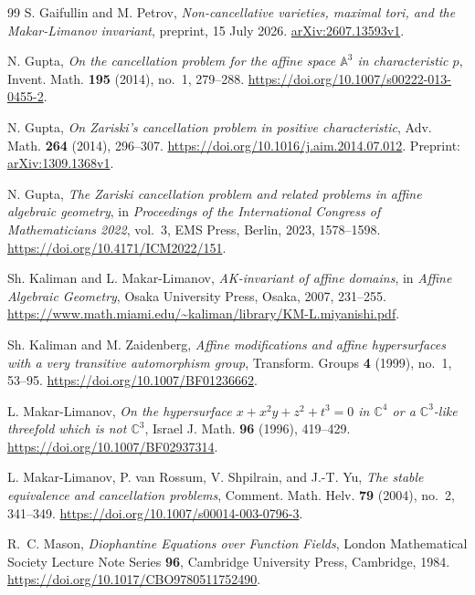\begin{thebibliography}{99}
S. Gaifullin and M. Petrov,
\emph{Non-cancellative varieties, maximal tori, and the Makar-Limanov invariant},
preprint, 15 July 2026.
\href{https://arxiv.org/abs/2607.13593v1}{arXiv:2607.13593v1}.

N. Gupta,
\emph{On the cancellation problem for the affine space $\mathbb A^3$
 in characteristic $p$},
Invent. Math. \textbf{195} (2014), no.~1, 279--288.
\url{https://doi.org/10.1007/s00222-013-0455-2}.

\begingroup\raggedright
N. Gupta,
\emph{On Zariski's cancellation problem in positive characteristic},
Adv. Math. \textbf{264} (2014), 296--307.
\url{https://doi.org/10.1016/j.aim.2014.07.012}.
Preprint: \href{https://arxiv.org/abs/1309.1368v1}{arXiv:1309.1368v1}.
\par\endgroup

N. Gupta,
\emph{The Zariski cancellation problem and related problems in affine algebraic geometry},
in \emph{Proceedings of the International Congress of Mathematicians 2022},
vol.~3, EMS Press, Berlin, 2023, 1578--1598.
\url{https://doi.org/10.4171/ICM2022/151}.

Sh. Kaliman and L. Makar-Limanov,
\emph{AK-invariant of affine domains},
in \emph{Affine Algebraic Geometry}, Osaka University Press, Osaka,
2007, 231--255.
\url{https://www.math.miami.edu/~kaliman/library/KM-L.miyanishi.pdf}.

Sh. Kaliman and M. Zaidenberg,
\emph{Affine modifications and affine hypersurfaces with a very
 transitive automorphism group},
Transform. Groups \textbf{4} (1999), no.~1, 53--95.
\url{https://doi.org/10.1007/BF01236662}.

L. Makar-Limanov,
\emph{On the hypersurface $x+x^2y+z^2+t^3=0$ in $\mathbb C^4$ or a
 $\mathbb C^3$-like threefold which is not $\mathbb C^3$},
Israel J. Math. \textbf{96} (1996), 419--429.
\url{https://doi.org/10.1007/BF02937314}.

L. Makar-Limanov, P. van Rossum, V. Shpilrain, and J.-T. Yu,
\emph{The stable equivalence and cancellation problems},
Comment. Math. Helv. \textbf{79} (2004), no.~2, 341--349.
\url{https://doi.org/10.1007/s00014-003-0796-3}.

R.~C. Mason,
\emph{Diophantine Equations over Function Fields},
London Mathematical Society Lecture Note Series \textbf{96},
Cambridge University Press, Cambridge, 1984.
\url{https://doi.org/10.1017/CBO9780511752490}.


\end{thebibliography}
